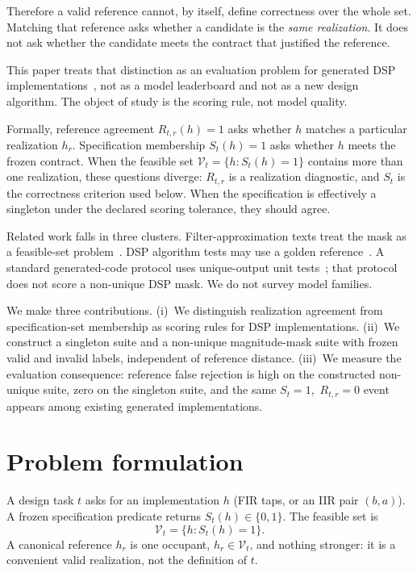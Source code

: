 \documentclass{article}
\begin{document}
Therefore a valid reference cannot, by itself, define correctness over
the whole set.
Matching that reference asks whether a candidate is the
\emph{same realization}.
It does not ask whether the candidate meets the contract that
justified the reference.

This paper treats that distinction as an evaluation problem for
generated DSP implementations~\cite{chen2021codex,liu2023evalplus},
not as a model leaderboard and not as a new design algorithm.
The object of study is the scoring rule, not model quality.

Formally, reference agreement $R_{t,r}(h)=1$ asks whether $h$ matches
a particular realization $h_r$.
Specification membership $S_t(h)=1$ asks whether $h$ meets the
frozen contract.
When the feasible set $\mathcal{V}_t=\{h:S_t(h)=1\}$ contains more
than one realization, these questions diverge:
$R_{t,r}$ is a realization diagnostic, and $S_t$ is the correctness
criterion used below.
When the specification is effectively a singleton under the
declared scoring tolerance, they should agree.

Related work falls in three clusters.
Filter-approximation texts treat the mask as a feasible-set
problem~\cite{oppenheim2010dsp,rabiner1975fir,herrmann1973linear}.
DSP algorithm tests may use a golden
reference~\cite{huuhtanen2015dsp}.
A standard generated-code protocol uses unique-output unit
tests~\cite{liu2023evalplus}; that protocol does not score a
non-unique DSP mask.
We do not survey model families.

We make three contributions.
(i)~We distinguish realization agreement from specification-set
membership as scoring rules for DSP implementations.
(ii)~We construct a singleton suite and a non-unique magnitude-mask
suite with frozen valid and invalid labels, independent of reference
distance.
(iii)~We measure the evaluation consequence: reference false rejection
is high on the constructed non-unique suite, zero on the singleton
suite, and the same $S_t=1$,~$R_{t,r}=0$ event appears among
existing generated implementations.

\section{Problem formulation}
\label{sec:form}

A design task $t$ asks for an implementation $h$ (FIR taps, or an IIR
pair $(b,a)$).
A frozen specification predicate returns $S_t(h)\in\{0,1\}$.
The feasible set is
\begin{equation}
\mathcal{V}_t=\{h:S_t(h)=1\}.
\label{eq:vt}
\end{equation}
A canonical reference $h_r$ is one occupant, $h_r\in\mathcal{V}_t$,
and nothing stronger: it is a convenient valid realization, not the
definition of $t$.
\end{document}
